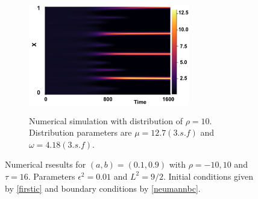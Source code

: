 \begin{figure}[H]
    \hfill
    \begin{subfigure}[t]{0.45\textwidth}
        \centering
        \includegraphics[width=7cm,height=5cm]{t1610.png}
        \caption{Numerical simulation with distribution of $\rho=10$. Distribution parameters are $\mu=12.7(3.s.f)$ and $\omega=4.18(3.s.f)$.}
        \label{}
    \end{subfigure}
    \caption{Numerical rsesults for $(a,b)=(0.1,0.9)$ with $\rho=-10,10$ and $\tau=16$. Parameters $\epsilon^2=0.01$ and $L^2=9/2$. Initial conditions given by \eqref{firstic} and boundary conditions by \eqref{neumannbc}.}
    \label{fig:linskew3}
\end{figure}
